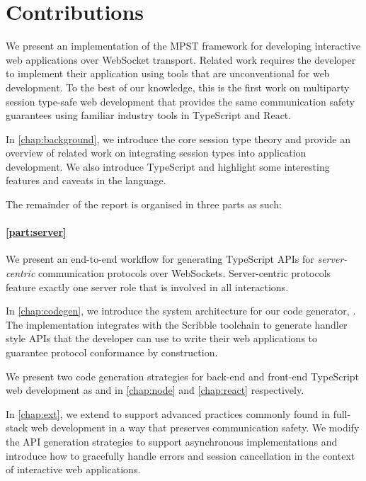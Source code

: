 \section{Contributions}

We present an implementation of the MPST framework for developing
interactive web applications over WebSocket transport. 
Related work \citep{PureScript2019, MVU2020, LINKS, Tiers} requires the 
developer to implement their application using tools that are 
unconventional for web development.
To the best of our knowledge, this is the first work on multiparty session
type-safe web development that provides the same communication safety 
guarantees using familiar industry tools in TypeScript and React.

In \cref{chap:background}, we introduce the core session type theory
and provide an overview of related work on integrating session types into
application development. We also introduce TypeScript and highlight some 
interesting features and caveats in the language.

The remainder of the report is organised in three parts as such:

\paragraph{\cref{part:server}}
We present an end-to-end workflow for generating TypeScript APIs for 
\emph{server-centric} communication protocols over WebSockets. Server-centric 
protocols feature exactly one server role that is involved in all interactions.

In \cref{chap:codegen}, we introduce the system architecture for our
code generator, . 
The implementation integrates with the Scribble
toolchain to generate handler style APIs that the developer can use to write 
their web applications to guarantee protocol conformance by construction.

We present two code generation strategies for back-end and front-end
TypeScript web development as  and 
in \cref{chap:node} and \cref{chap:react} respectively.

In \cref{chap:ext}, we extend  to support advanced
practices commonly found in full-stack web development in a way that
preserves communication safety. We modify the API generation strategies
to support asynchronous implementations and introduce how to 
gracefully handle errors and session cancellation 
in the context of interactive web applications.

